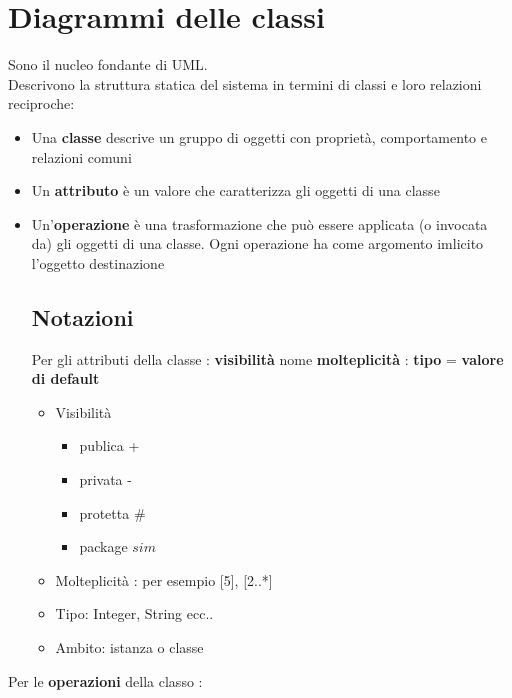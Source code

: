 \documentclass{report}
\begin{document}
            \section{Diagrammi delle classi}
                Sono il nucleo fondante di UML.
                \\
                Descrivono la struttura statica del sistema in termini di classi e loro relazioni reciproche:
                \begin{itemize}
                    \item Una \textbf{classe} descrive un gruppo di oggetti con proprietà, comportamento e relazioni comuni
                    \item Un \textbf{attributo} è un valore che caratterizza gli oggetti di una classe
                    \item Un'\textbf{operazione} è una trasformazione che può essere applicata (o invocata da) gli oggetti di una classe. Ogni operazione ha come argomento imlicito l'oggetto destinazione
                \subsection{Notazioni}
                    Per gli attributi della classe : \textbf{visibilità} nome \textbf{molteplicità} : \textbf{tipo} = \textbf{valore di default}
                    \begin{itemize}
                        \item Visibilità 
                            \begin{itemize}
                                \item publica +
                                \item privata -
                                \item protetta \#
                                \item package $sim$
                            \end{itemize}
                        \item Molteplicità : per esempio [5], [2..*]
                        \item Tipo: Integer, String ecc..
                        \item Ambito: istanza o classe
                    \end{itemize}
                \end{itemize}
                Per le \textbf{operazioni} della classo :
                \\
\end{document}
